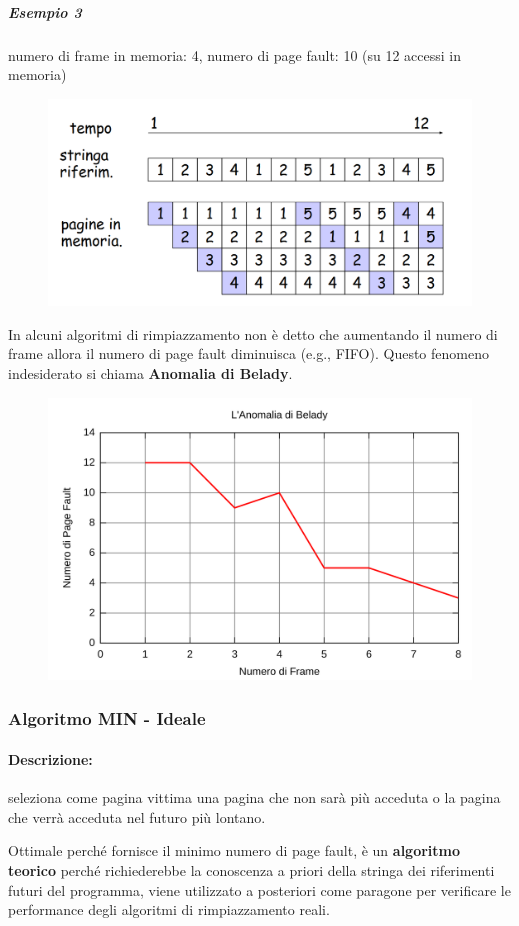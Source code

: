 \subparagraph{Esempio 3}
numero di frame in memoria: 4, numero di page fault: 10 (su 12 accessi in memoria)

\begin{figure} [h]
    \centering
    \includegraphics[width=0.65\linewidth]{Images/Screenshot 2025-01-17 at 17-44-49 so-05-memoria - so-05-memoria.pdf.png}
\end{figure}

In alcuni algoritmi di rimpiazzamento non è detto che aumentando il numero di frame allora il numero di page fault diminuisca (e.g., FIFO).
Questo fenomeno indesiderato si chiama \textbf{Anomalia di Belady}.

\begin{figure} [h]
    \centering
    \includegraphics[width=0.65\linewidth]{Images/Anomalia_di_Belady.svg.png}
\end{figure}
\newpage
\subsubsection{Algoritmo MIN - Ideale}
\paragraph{Descrizione:} seleziona come pagina vittima una pagina che non sarà più acceduta o la pagina che verrà acceduta nel futuro più lontano.

Ottimale perché fornisce il minimo numero di page fault, è un \textbf{algoritmo teorico} perché richiederebbe la conoscenza a priori della stringa dei riferimenti futuri del programma,
viene utilizzato a posteriori come paragone per verificare le
performance degli algoritmi di rimpiazzamento reali.

